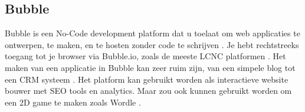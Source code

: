 

\subsection{Bubble}%
\label{subsec:bubble}
Bubble is een No-Code development platform dat u toelaat om web applicaties te ontwerpen, te maken, en te hosten zonder code te schrijven \autocite{Sharma2022}.
Je hebt rechtstreeks toegang tot je browser via Bubble.io, zoals de meeste LCNC platformen \autocite{Minor2022}. Het maken van een applicatie in Bubble kan zeer ruim zijn, van een simpele blog tot een CRM systeem \autocite{Sharma2022}.
Het platform kan gebruikt worden als interactieve website bouwer met SEO tools en analytics. Maar zou ook kunnen gebruikt worden om een 2D game te maken zoals Wordle \autocite{Minor2022}.

